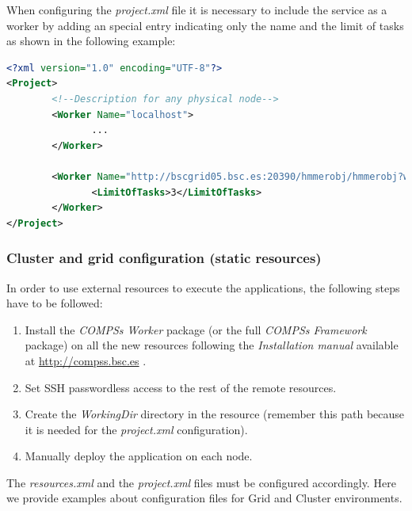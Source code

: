 When configuring the \textit{project.xml} file it is necessary to include the service as a worker by adding an
special entry indicating only the name and the limit of tasks as shown in the following example:
\begin{lstlisting}[language=xml]
<?xml version="1.0" encoding="UTF-8"?>
<Project>
        <!--Description for any physical node-->
        <Worker Name="localhost">
               ...
        </Worker>

        <Worker Name="http://bscgrid05.bsc.es:20390/hmmerobj/hmmerobj?wsdl">
               <LimitOfTasks>3</LimitOfTasks>
        </Worker>
</Project>
\end{lstlisting}

\subsubsection{Cluster and grid configuration (static resources)}
In order to use external resources to execute the applications, the following steps have to be followed:

\begin{enumerate}
 \item Install the \textit{COMPSs Worker} package (or the full \textit{COMPSs Framework} package) on all the new 
 resources following the \textit{Installation manual} available at \url{http://compss.bsc.es} .
 \item Set SSH passwordless access to the rest of the remote resources.
 \item Create the \textit{WorkingDir} directory in the resource (remember this path because it is needed 
 for the \textit{project.xml} configuration).
 \item Manually deploy the application on each node.
\end{enumerate}

The \textit{resources.xml} and the \textit{project.xml} files must be configured accordingly.
Here we provide examples about configuration files for Grid and Cluster environments.

